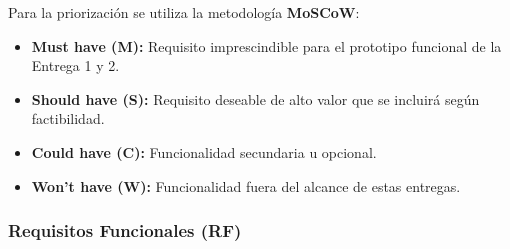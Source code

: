 \documentclass[11pt,letterpaper]{article}
\begin{document}
Para la priorización se utiliza la metodología \textbf{MoSCoW}:
\begin{itemize}
    \item \textbf{Must have (M):} Requisito imprescindible para el prototipo funcional de la Entrega 1 y 2.
    \item \textbf{Should have (S):} Requisito deseable de alto valor que se incluirá según factibilidad.
    \item \textbf{Could have (C):} Funcionalidad secundaria u opcional.
    \item \textbf{Won't have (W):} Funcionalidad fuera del alcance de estas entregas.
\end{itemize}

\subsubsection{Requisitos Funcionales (RF)}
\end{document}
